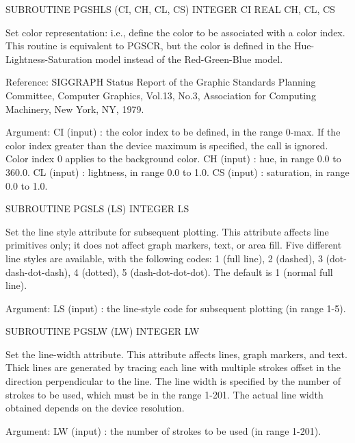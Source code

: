 {\eightpoint\begintt
      SUBROUTINE PGSHLS (CI, CH, CL, CS)
      INTEGER CI
      REAL    CH, CL, CS
 
Set color representation: i.e., define the color to be
associated with a color index.  This routine is equivalent to
PGSCR, but the color is defined in the Hue-Lightness-Saturation
model instead of the Red-Green-Blue model.
 
Reference: SIGGRAPH Status Report of the Graphic Standards Planning
Committee, Computer Graphics, Vol.13, No.3, Association for
Computing Machinery, New York, NY, 1979.
 
Argument:
 CI     (input)  : the color index to be defined, in the range 0-max.
                   If the color index greater than the device
                   maximum is specified, the call is ignored. Color
                   index 0 applies to the background color.
 CH     (input)  : hue, in range 0.0 to 360.0.
 CL     (input)  : lightness, in range 0.0 to 1.0.
 CS     (input)  : saturation, in range 0.0 to 1.0.
\endtt}

{\eightpoint\begintt
      SUBROUTINE PGSLS (LS)
      INTEGER  LS
 
Set the line style attribute for subsequent plotting. This
attribute affects line primitives only; it does not affect graph
markers, text, or area fill.
Five different line styles are available, with the following codes:
1 (full line), 2 (dashed), 3 (dot-dash-dot-dash), 4 (dotted),
5 (dash-dot-dot-dot). The default is 1 (normal full line).
 
Argument:
 LS     (input)  : the line-style code for subsequent plotting
                   (in range 1-5).
\endtt}

{\eightpoint\begintt
      SUBROUTINE PGSLW (LW)
      INTEGER  LW
 
Set the line-width attribute. This attribute affects lines, graph
markers, and text. Thick lines are generated by tracing each line
with multiple strokes offset in the direction perpendicular to the
line. The line width is specified by the number of strokes to be
used, which must be in the range 1-201. The actual line width
obtained depends on the device resolution.
 
Argument:
 LW     (input)  : the number of strokes to be used
                   (in range 1-201).
\endtt}

